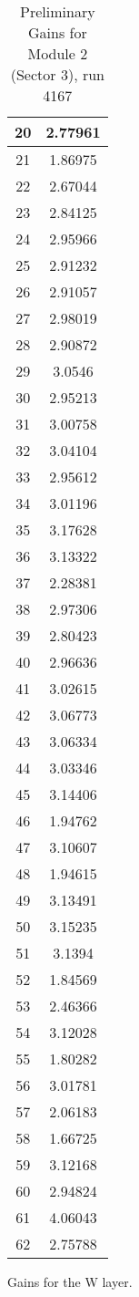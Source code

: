 \begin{table}[h]
\begin{subtable}[h]{2in}
{\begin{tabular}{|c|c|}
20	&	2.77961	\\	\hline
21	&	1.86975	\\	\hline
22	&	2.67044	\\	\hline
23	&	2.84125	\\	\hline
24	&	2.95966	\\	\hline
25	&	2.91232	\\	\hline
26	&	2.91057	\\	\hline
27	&	2.98019	\\	\hline
28	&	2.90872	\\	\hline
29	&	3.0546	\\	\hline
30	&	2.95213	\\	\hline
31	&	3.00758	\\	\hline
32	&	3.04104	\\	\hline
33	&	2.95612	\\	\hline
34	&	3.01196	\\	\hline
35	&	3.17628	\\	\hline
36	&	3.13322	\\	\hline
37	&	2.28381	\\	\hline
38	&	2.97306	\\	\hline
39	&	2.80423	\\	\hline
40	&	2.96636	\\	\hline
41	&	3.02615	\\	\hline
42	&	3.06773	\\	\hline
43	&	3.06334	\\	\hline
44	&	3.03346	\\	\hline
45	&	3.14406	\\	\hline
46	&	1.94762	\\	\hline
47	&	3.10607	\\	\hline
48	&	1.94615	\\	\hline
49	&	3.13491	\\	\hline
50	&	3.15235	\\	\hline
51	&	3.1394	\\	\hline
52	&	1.84569	\\	\hline
53	&	2.46366	\\	\hline
54	&	3.12028	\\	\hline
55	&	1.80282	\\	\hline
56	&	3.01781	\\	\hline
57	&	2.06183	\\	\hline
58	&	1.66725	\\	\hline
59	&	3.12168	\\	\hline
60	&	2.94824	\\	\hline
61	&	4.06043	\\	\hline
62	&	2.75788	\\	\hline
        \end{tabular}
        }
        \caption{Gains for the W layer.}
    \end{subtable}
    \caption{Preliminary Gains for Module 2 (Sector 3), run 4167}
\end{table}


